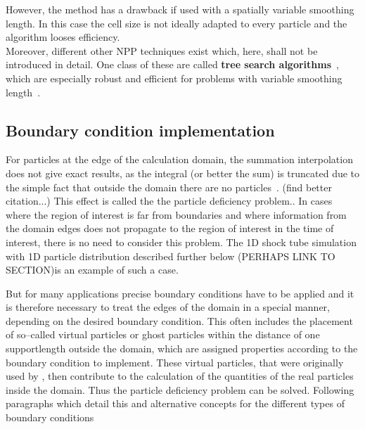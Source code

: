 \documentclass{report}
\begin{document}
However, the method has a drawback if used with a spatially variable smoothing
length. In this case the cell size is not ideally adapted to every particle
and the algorithm looses efficiency.
\\
Moreover, different other NPP techniques exist which, here, shall not be introduced in
detail. One class of these are called {\bf tree search algorithms}~\cite{Hernquist1989}, which are
especially robust and efficient for problems with variable smoothing
length~\cite{Liu2003}.













\subsection{Boundary condition implementation}
\label{sec:boundaryConditionImplementation}
For particles at the edge of the calculation domain, the summation interpolation does not
give exact results, as the integral (or better the sum) is truncated due to
the simple fact that outside the domain there are no
particles~\cite{Liu2003}. (find better citation...) This effect is called the
the particle deficiency
problem.\cite{Liu2003}. In cases where the region of interest is far from boundaries
and where information from the domain edges does not propagate to the region of interest
in the time of interest, there is no need to consider this
problem. 
The 1D shock tube simulation with 1D particle distribution described further below
(PERHAPS LINK TO SECTION)is an example of such a case.  

But for many applications precise boundary conditions have to be applied and it is therefore necessary to treat the edges of the domain in a special manner, depending on the desired boundary condition. This often includes the placement of so--called virtual particles or ghost particles within the distance of one supportlength outside the domain, which are assigned properties according to the boundary condition to implement.
These virtual particles, that were originally used by \cite{Libersky1993}, then contribute to the calculation of the quantities of the real particles inside the domain. Thus the particle deficiency problem can be solved. 
 Following paragraphs which detail this and alternative concepts for the different types of boundary conditions
\end{document}
